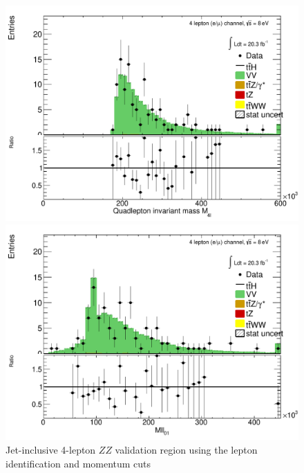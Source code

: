 \begin{figure}[htbp]
\begin{minipage}[h]{0.5\textwidth}
    \centering \includegraphics[width=\textwidth]{figs/WZ/plotCand_4lep_ZZ_CR_Mllll}
  \end{minipage}\hfill
  \begin{minipage}[h]{0.5\textwidth}
    \centering \includegraphics[width=\textwidth]{figs/WZ/plotCand_4lep_ZZ_CR_Mll01}
  \end{minipage}\hfill

  \caption{Jet-inclusive 4-lepton $ZZ$ validation region using the \tth lepton identification and momentum cuts }
  \label{figure:background_zz_incl}
\end{figure}


